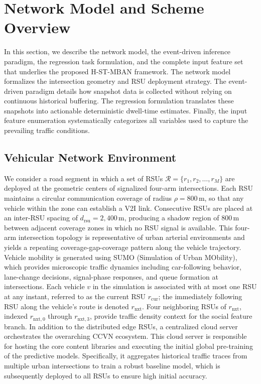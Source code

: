 \documentclass[journal]{IEEEtran}
\begin{document}
\section{Network Model and Scheme Overview}\label{sec:system}

In this section, we describe the network model, the event-driven inference paradigm, the regression task formulation, and the complete input feature set that underlies the proposed H-ST-MBAN framework. The network model formalizes the intersection geometry and RSU deployment strategy. The event-driven paradigm details how snapshot data is collected without relying on continuous historical buffering. The regression formulation translates these snapshots into actionable deterministic dwell-time estimates. Finally, the input feature enumeration systematically categorizes all variables used to capture the prevailing traffic conditions.

\subsection{Vehicular Network Environment}
\label{sec.net.A}

We consider a road segment in which a set of RSUs
$\mathcal{R} = \{r_1, r_2, \ldots, r_M\}$ are deployed at the geometric centers
of signalized four-arm intersections.
Each RSU maintains a circular communication coverage of radius
$\rho = 800\,\text{m}$, so that any vehicle within the zone can establish a V2I link.
Consecutive RSUs are placed at an inter-RSU spacing of $d_{\text{rsu}} = 2{,}400\,\text{m}$,
producing a shadow region of $800\,\text{m}$ between adjacent coverage zones in which
no RSU signal is available.
This four-arm intersection topology is representative of urban arterial environments
and yields a repeating coverage-gap-coverage pattern along the vehicle trajectory.
Vehicle mobility is generated using SUMO (Simulation of Urban MObility), which
provides microscopic traffic dynamics including car-following behavior,
lane-change decisions, signal-phase responses, and queue formation at intersections.
Each vehicle $v$ in the simulation is associated with at most one RSU at any instant,
referred to as the current RSU $r_{\text{cur}}$; the immediately following RSU along
the vehicle's route is denoted $r_{\text{nxt}}$.
Four neighboring RSUs of $r_{\text{nxt}}$, indexed $r_{\text{nxt},0}$ through
$r_{\text{nxt},3}$, provide traffic density context for the social feature branch.
In addition to the distributed edge RSUs, a centralized cloud server orchestrates the overarching CCVN ecosystem.
This cloud server is responsible for hosting the core content libraries and executing the initial global pre-training of the predictive models.
Specifically, it aggregates historical traffic traces from multiple urban intersections to train a robust baseline model, which is subsequently deployed to all RSUs to ensure high initial accuracy.
\end{document}
